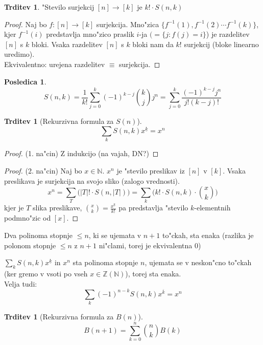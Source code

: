 \documentclass[a4paper,12pt]{article}
\theoremstyle{definition}
\newtheorem{conseq}[counter]{Posledica}
\newtheorem{claim}[counter]{Trditev}
\theoremstyle{remark}
\newcommand{\N}{\mathbb{N}}
\newcommand{\Z}{\mathbb{Z}}
\begin{document}
\begin{claim}
    "Stevilo surjekcij $[n] \rightarrow [k]$ je $k! \cdot S(n,k)$
\end{claim}

\begin{proof}
    Naj bo $f: [n] \rightarrow [k]$ surjekcija.
    Mno"zica $\{f^{-1}(1), f^{-1}(2) \cdots f^{-1}(k)\}$, kjer $f^{-1}(i)$ predstavlja mno"zico praslik $i$-ja $(=\{j: f(j) = i\}$) je razdelitev $[n]$ s $k$ bloki. Vsaka razdelitev $[n]$ s $k$ bloki nam da $k!$ surjekcij
    (bloke linearno uredimo).
    \\
    Ekvivalentno: urejena razdelitev $\equiv$ surjekcija.
\end{proof}

\begin{conseq}
	\[S(n,k) = \frac{1}{k!} \sum_{j=0}^k (-1)^{k-j} \binom{k}{j}j^n = \sum_{j=0}^k \frac{(-1)^{k-j} j^n}{j! (k-j)!}\]
\end{conseq}

\begin{claim}[Rekurzivna formula za $S(n)$]
    \[\sum_k S(n,k)x^{\underline{k}} = x^n\]
\end{claim}

\begin{proof}(1. na"cin)
	Z indukcijo (na vajah, DN?)
\end{proof}
\begin{proof}(2. na"cin)
    Naj bo $x \in \N$.
    $x^n$ je "stevilo preslikav iz $[n]$ v $[k]$.
    Vsaka preslikava je surjekcija na svojo sliko (zalogo vrednosti).
    \[x^n = \sum_T \big(|T|! \cdot S(n,|T|)\big) = \sum_k \big(k! \cdot S(n,k) \cdot \binom{x}{k}\big)\]
    kjer je $T$ slika preslikave, $\binom{x}{k} = \frac{x^{\underline{k}}}{k!}$ pa predstavlja "stevilo $k$-elementnih podmno"zic od $[x]$.
\end{proof}

\label{TODO: surprise analiza? kaj so te polinomi kle?}
Dva polinoma stopnje $\leq n$, ki se ujemata v $n+1$ to"ckah, sta enaka (razlika je polonom stopnje $\leq n$ z $n+1$ ni"clami, torej je ekvivalentna 0)

$\sum_k S(n,k)x^{\underline{k}}$ in $x^n$ sta polinoma stopnje $n$, ujemata se v neskon"cno to"ckah (ker gremo v vsoti po vseh $x \in \Z(\N)$), torej sta enaka.
\\
Velja tudi: \[\sum_k (-1)^{n-k} S(n,k) x^{\overline{k}} = x^n\]

\begin{claim}[Rekurzivna formula za $B(n)$]
    \[B(n+1) = \sum_{k=0}^n \binom{n}{k} B(k)\]
\end{claim}
\end{document}
